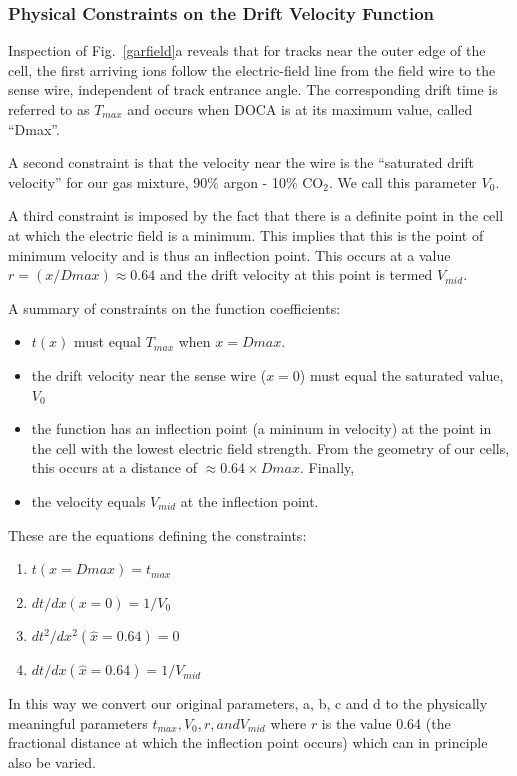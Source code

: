 \subsubsection{Physical Constraints on the Drift Velocity Function}

Inspection of  Fig.~\ref{garfield}a reveals that for tracks near the outer
edge of the cell, the first arriving ions follow the electric-field line from 
the field wire to the sense wire, independent of track entrance angle.  The
corresponding drift time is referred to as $T_{max}$ and occurs when DOCA is at its maximum value,
called ``Dmax''.

A second constraint is that the velocity near the wire is the ``saturated drift
velocity'' for our gas mixture, 90$\%$ argon - 10$\%$ CO$_2$.  We call this parameter $V_0$.

A third constraint is imposed by the fact that there is a definite point in the
cell at which the electric field is a minimum.  This implies that this is the point
of minimum velocity and is thus an inflection point.  This occurs at a value
$r = (x/Dmax) \approx 0.64$ and the drift velocity at this point is termed $V_{mid}$.

A summary of constraints on the function coefficients:
\begin{itemize}
\item  $t(x)$ must equal $T_{max}$ when $x = Dmax $.
\item  the drift velocity near the sense wire ($x = 0$)
must equal the saturated value, $V_0$
\item the function has an inflection point (a
mininum in velocity) at the point in the cell with the lowest electric field
strength.  From the geometry of our cells, this occurs at a distance
of $\approx 0.64 \times Dmax$.  Finally,
\item the velocity equals $V_{mid}$ at the inflection point.
\end{itemize}

These are the equations defining the constraints:
\begin{enumerate}
\item $t(x = Dmax) = t_{max}$
\item $dt / dx (x = 0) = 1 / V_0$
\item $dt^2 / dx^2 (\hat{x} = 0.64 ) = 0$   
\item $dt / dx (\hat{x} = 0.64 ) = 1/V_{mid}$  
\end{enumerate}

In this way we convert our original parameters, a, b, c and d to the physically meaningful
parameters $t_{max}, V_0, r, and V_{mid}$ where $r$ is the value 0.64 (the fractional distance
at which the inflection point occurs) which can in principle also be varied.


